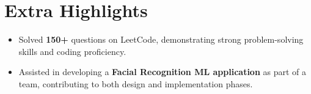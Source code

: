 \documentclass[letterpaper,11pt]{article}
\makeatletter
\newcommand{\resumeItem}[1]{
  \item\small{
    {#1 \vspace{-2pt}}
  }
}
\newcommand{\resumeSubheading}[4]{
  \vspace{-2pt}\item
    \begin{tabular*}{1.0\textwidth}[t]{l@{\extracolsep{\fill}}r}
      \textbf{\large#1} & \textbf{\small #2} \\
      \textit{\large#3} & \textit{\small #4} \\
      
    \end{tabular*}\vspace{-7pt}
}
\newcommand{\resumeSubHeadingListStart}{\begin{itemize}[leftmargin=0.0in, label={}]}
\newcommand{\resumeSubHeadingListEnd}{\end{itemize}}
\newcommand{\resumeItemListStart}{\begin{itemize}}
\newcommand{\resumeItemListEnd}{\end{itemize}\vspace{-5pt}}
\makeatother
\begin{document}
 \section{Extra Highlights}
    \resumeSubHeadingListStart
        
            \resumeItemListStart
                \resumeItem{\normalsize{Solved \textbf{150+} questions on LeetCode, demonstrating strong problem-solving skills and coding proficiency.}}
                \resumeItem{\normalsize{Assisted in developing a \textbf{Facial Recognition ML application} as part of a team, contributing to both design and implementation phases. }}
            \resumeItemListEnd
    \resumeSubHeadingListEnd
 \vspace{-11pt}
 
 
\end{document}
